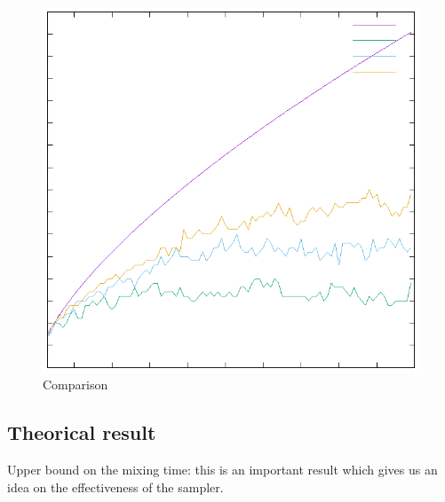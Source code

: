 \documentclass[a4paper]{article}
\begin{document}
\begin{figure}
  \includegraphics{comparison}
  \caption{Comparison}
  \label{}
\end{figure}

\subsection*{Theorical result}
Upper bound on the mixing time: this is an important result which gives us an idea on the effectiveness of the sampler.
\end{document}
